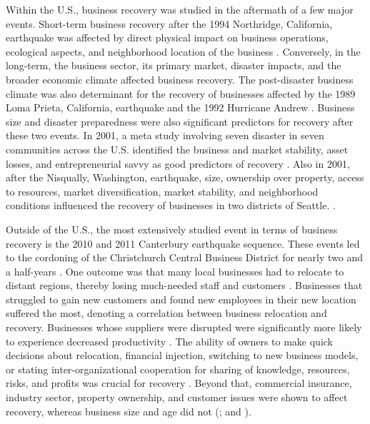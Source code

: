 Within the U.S., business recovery was studied in the aftermath of a few major events. Short-term business recovery after the 1994 Northridge, California, earthquake was affected by direct physical impact on business operations, ecological aspects, and neighborhood location of the business \citep{dahlhamer1998rebounding}. Conversely, in the long-term, the business sector, its primary market, disaster impacts, and the broader economic climate affected business recovery. The post-disaster business climate was also determinant for the recovery of businesses affected by the 1989 Loma Prieta, California, earthquake and the 1992 Hurricane Andrew \citep{webb2002predicting}. Business size and disaster preparedness were also significant predictors for recovery after these two events. In 2001, a meta study involving seven disaster in seven communities across the U.S. identified the business and market stability, asset losses, and entrepreneurial savvy as good predictors of recovery \citep{alesch2001organizations}. Also in 2001, after the Nisqually, Washington, earthquake, size, ownership over property, access to resources, market diversification, market stability, and neighborhood conditions influenced the recovery of businesses in two districts of Seattle. \citep{chang2002disaster}. \

Outside of the U.S., the most extensively studied event in terms of business recovery is the 2010 and 2011 Canterbury earthquake sequence. These events led to the cordoning of the Christchurch Central Business District for nearly two and a half-years \citep{brown2019business}. One outcome was that many local businesses had to relocate to distant regions, thereby losing much-needed staff and customers \citep{morrish2020post}. Businesses that struggled to gain new customers and found new employees in their new location suffered the most, denoting a correlation between business relocation and recovery. Businesses whose suppliers were disrupted were significantly more likely to experience decreased productivity \citep{brown2019business}. The ability of owners to make quick decisions about relocation, financial injection, switching to new business models, or stating inter-organizational cooperation for sharing of knowledge, resources, risks, and profits was crucial for recovery \citep{stevenson2014organizational,morrish2011entrepreneurial}. Beyond that, commercial insurance, industry sector, property ownership, and customer issues were shown to affect recovery, whereas business size and age did not (\cite{brown2017efficacy,brown2015factors}; and \cite{kachali2015industry}). \

